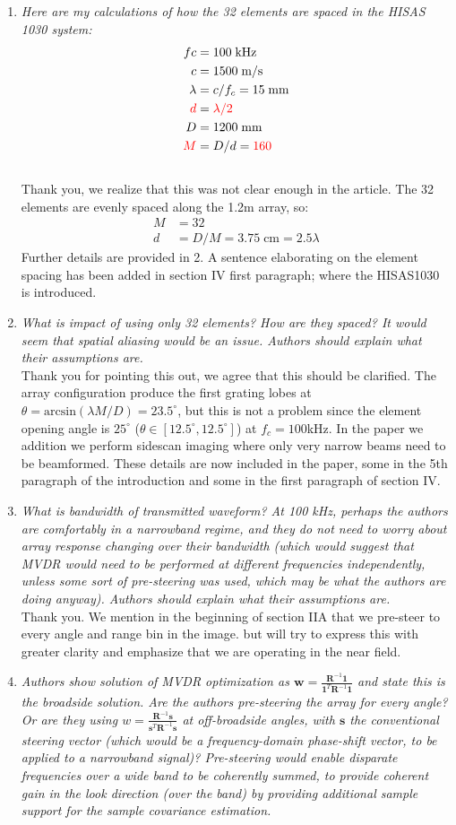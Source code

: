 \documentclass[11pt]{article} %
\newcommand\T{^{\scriptscriptstyle T}}
\renewcommand\vec[1]{\boldsymbol{#1}}
\newcommand\mat[1]{\boldsymbol{#1}}
\newcommand\1{\vec 1}
\newcommand*\s{\vec s}
\newcommand*\w{\vec w}
\newcommand*\R{\mat R}
\newcommand*\Ri{\R^{-1}}
\renewcommand*\t{^T}
\newcommand\q[1]{\textit{#1}}
\newcommand\qi[1]{\item\q{#1}}
\newcommand\ans[1]{#1}
\newcommand\ai[1]{\\[.5\baselineskip]\ans{#1}}
\begin{document}
\begin{enumerate}
\qi{Here are my calculations of how the 32 elements are spaced in the HISAS 1030 system:}
\begin{align}
fc &= 100\;\text{kHz} \\
c  &= 1500\;\text{m/s} \\
\lambda &= c/f_c = 15\;\text{mm} \\
\textcolor{red}{ d } &= \textcolor{red}{\lambda/2 } \\
D &= 1200\;\text{mm} \\
\textcolor{red}{M} &= D/d = \textcolor{red}{160}
\end{align}
\ai{Thank you, we realize that this was not clear enough in the article. The 32 elements are evenly spaced along the 1.2m array, so:
\begin{align}
M &= 32 \\
d &= D / M = 3.75\;\text{cm} = 2.5\lambda
\end{align}
Further details are provided in 2. A sentence elaborating on the element spacing has been added in section IV first paragraph; where the HISAS1030 is introduced.}
%
\qi{What is impact of using only 32 elements? How are they spaced? It would seem that spatial aliasing would be an issue. Authors should explain what their assumptions are.}
\ai{Thank you for pointing this out, we agree that this should be clarified. The array configuration produce the first grating lobes at $\theta = \text{arcsin}(\lambda M/D) = 23.5^\circ$, but this is not a problem since the element opening angle is $25^\circ$ ($\theta\in[12.5^\circ,12.5^\circ]$) at $f_c=100$\;kHz. In the paper we addition we perform sidescan imaging where only very narrow beams need to be beamformed. These details are now included in the paper, some in the 5th paragraph of the introduction and some in the first paragraph of section IV.}
%
\qi{What is bandwidth of transmitted waveform? At 100 kHz, perhaps the authors are comfortably in a narrowband regime, and they do not need to worry about array response changing over their bandwidth (which would suggest that MVDR would need to be performed at different frequencies independently, unless some sort of pre-steering was used, which may be what the authors are doing anyway). Authors should explain what their assumptions are.}
\ai{Thank you. We mention in the beginning of section IIA that we pre-steer to every angle and range bin in the image. but will try to express this with greater clarity and emphasize that we are operating in the near field.}
%
\qi{Authors show solution of MVDR optimization as $\w = \frac{\Ri\1}{\1\T\Ri\1}$ and state this is the broadside solution. Are the authors pre-steering the array for every angle? Or are they using $w = \frac{\Ri\s}{\s\t\Ri\s}$ at off-broadside angles, with $\s$ the conventional steering vector (which would be a frequency-domain phase-shift vector, to be applied to a narrowband signal)? Pre-steering would enable disparate frequencies over a wide band to be coherently summed, to provide coherent gain in the look direction (over the band) by providing additional sample support for the sample covariance estimation.}

\end{enumerate}
\end{document}
